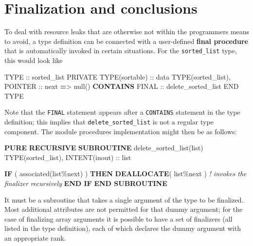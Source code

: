 \documentclass[]{scrartcl}
\newenvironment{Shaded}{}{}
\newcommand{\CommentTok}[1]{\textcolor[rgb]{0.38,0.63,0.69}{\textit{#1}}}
\newcommand{\DataTypeTok}[1]{\textcolor[rgb]{0.56,0.13,0.00}{#1}}
\newcommand{\FunctionTok}[1]{\textcolor[rgb]{0.02,0.16,0.49}{#1}}
\newcommand{\KeywordTok}[1]{\textcolor[rgb]{0.00,0.44,0.13}{\textbf{#1}}}
\newcommand{\NormalTok}[1]{#1}
\newcommand{\OperatorTok}[1]{\textcolor[rgb]{0.40,0.40,0.40}{#1}}
\begin{document}
\section{Finalization and
conclusions}\label{finalization-and-conclusions}

To deal with resource leaks that are otherwise not within the
programmer\textquotesingle s means to avoid, a type definition can be
connected with a user-defined \textbf{final procedure} that is
automatically invoked in certain situations. For the
\texttt{sorted\_list} type, this would look like

\begin{Shaded}
\begin{Highlighting}[]
\DataTypeTok{TYPE} \DataTypeTok{::}\NormalTok{ sorted\_list}
   \DataTypeTok{PRIVATE}
   \DataTypeTok{TYPE(sortable)} \DataTypeTok{::}\NormalTok{ data}
   \DataTypeTok{TYPE(sorted\_list)}\NormalTok{, }\DataTypeTok{POINTER} \DataTypeTok{::}\NormalTok{ next }\KeywordTok{=}\OperatorTok{\textgreater{}}\NormalTok{ null()}
\KeywordTok{CONTAINS}
   \DataTypeTok{FINAL} \DataTypeTok{::}\NormalTok{ delete\_sorted\_list}
\DataTypeTok{END TYPE}
\end{Highlighting}
\end{Shaded}

Note that the \texttt{FINAL} statement appears after a \texttt{CONTAINS}
statement in the type definition; this implies that
\texttt{delete\_sorted\_list} is not a regular type component. The
module procedure\textquotesingle s implementation might then be as
follows:

\begin{Shaded}
\begin{Highlighting}[]
\KeywordTok{PURE} \KeywordTok{RECURSIVE} \KeywordTok{SUBROUTINE}\NormalTok{ delete\_sorted\_list(list)}
   \DataTypeTok{TYPE(sorted\_list)}\NormalTok{, }\DataTypeTok{INTENT(inout)} \DataTypeTok{::}\NormalTok{ list}

   \KeywordTok{IF}\NormalTok{ ( }\FunctionTok{associated}\NormalTok{(list}\OperatorTok{\%}\NormalTok{next) ) }\KeywordTok{THEN}
      \KeywordTok{DEALLOCATE}\NormalTok{( list}\OperatorTok{\%}\NormalTok{next )  }\CommentTok{! invokes the finalizer recursively}
   \KeywordTok{END IF}
\KeywordTok{END SUBROUTINE}
\end{Highlighting}
\end{Shaded}

It must be a subroutine that takes a single argument of the type to be
finalized. Most additional attributes are not permitted for that dummy
argument; for the case of finalizing array arguments it is possible to
have a set of finalizers (all listed in the type definition), each of
which declares the dummy argument with an appropriate rank.
\end{document}
